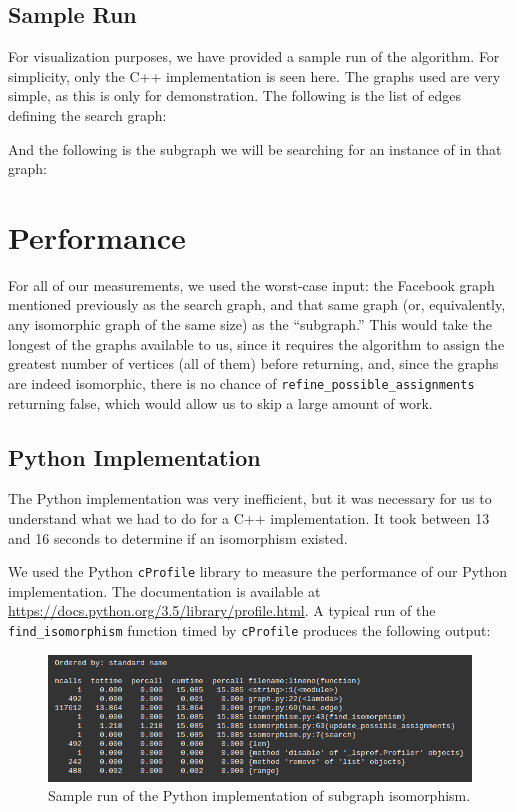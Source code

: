 \documentclass{article}
\begin{document}
  \subsection{Sample Run}

  For visualization purposes, we have provided a sample run of the algorithm. For simplicity, only the C++ implementation is seen here. The graphs used are very simple, as this is only for demonstration. The following is the list of edges defining the search graph:

  

  And the following is the subgraph we will be searching for an instance of in that graph:

  
\section{Performance}

For all of our measurements, we used the worst-case input: the Facebook graph mentioned previously as the search graph, and that same graph (or, equivalently, any isomorphic graph of the same size) as the ``subgraph.'' This would take the longest of the graphs available to us, since it requires the algorithm to assign the greatest number of vertices (all of them) before returning, and, since the graphs are indeed isomorphic, there is no chance of \texttt{refine\_possible\_assignments} returning false, which would allow us to skip a large amount of work.

  \subsection{Python Implementation}
  The Python implementation was very inefficient, but it was necessary for us to understand what we had to do for a C++ implementation. It took between 13 and 16 seconds to determine if an isomorphism existed.

  We used the Python \texttt{cProfile} library to measure the performance of our Python implementation. The documentation is available at \url{https://docs.python.org/3.5/library/profile.html}. A typical run of the \texttt{find\_isomorphism} function timed by \texttt{cProfile} produces the following output:

  \begin{figure}[H]
    \centering
    \includegraphics[scale=0.6]{images/perf}
    \caption{Sample run of the Python implementation of subgraph isomorphism.}
  \end{figure}
\end{document}
